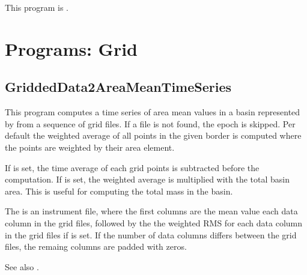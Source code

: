 This program is .
\clearpage
\section{Programs: Grid}
\subsection{GriddedData2AreaMeanTimeSeries}\label{GriddedData2AreaMeanTimeSeries}
This program computes a time series of area mean values
in a basin represented by  from a sequence of grid files.
If a file is not found, the epoch is skipped. Per default
the weighted average of all points in the given border is computed where the points are weighted by their area element.

If  is set, the time average of each grid points is subtracted before the computation.
If  is set, the weighted average is multiplied with the total basin area.
This is useful for computing the total mass in the basin.

The  is an instrument file, where the first columns are the
mean value each data column in the grid files, followed by the the weighted RMS
for each data column in the grid files if  is set.
If the number of data columns differs between the grid files, the remaing columns are padded with zeros.

See also .


